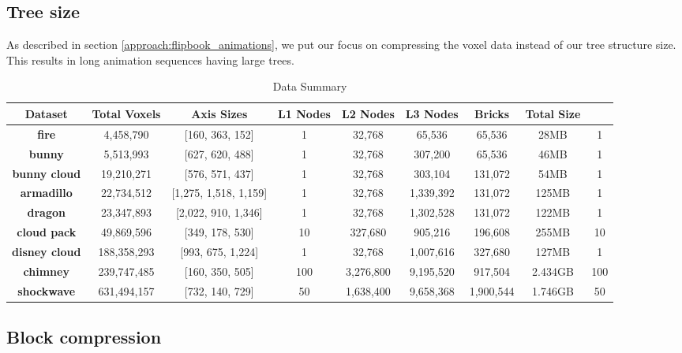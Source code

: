 \subsection{Tree size} \label{results:tree_size}
As described in section \ref{approach:flipbook_animations}, we put our focus on compressing the voxel data instead of our tree structure size. This results in long animation sequences having large trees.  

\begin{table}[htbp]
    \centering
    \caption{Data Summary}
    \label{tab:data-summary}
    \begin{tabularx}{\textwidth}{|c|c|c|c|c|c|c|c|c|}
    \hline
    \textbf{Dataset} & \textbf{Total Voxels} & \textbf{Axis Sizes} & \textbf{L1 Nodes} & \textbf{L2 Nodes} & \textbf{L3 Nodes} & \textbf{Bricks} & \textbf{Total Size} \\
    \hline
    \textbf{fire} & 4,458,790 & [160, 363, 152] & 1 & 32,768 & 65,536 & 65,536 & 28MB & 1 \\
    \hline
    \textbf{bunny} & 5,513,993 & [627, 620, 488] & 1 & 32,768 & 307,200 & 65,536 & 46MB & 1 \\
    \hline
    \textbf{bunny cloud} & 19,210,271 & [576, 571, 437] & 1 & 32,768 & 303,104 & 131,072 & 54MB & 1 \\
    \hline
    \textbf{armadillo} & 22,734,512 & [1,275, 1,518, 1,159] & 1 & 32,768 & 1,339,392 & 131,072 & 125MB & 1 \\
    \hline
    \textbf{dragon} & 23,347,893 & [2,022, 910, 1,346] & 1 & 32,768 & 1,302,528 & 131,072 & 122MB & 1 \\
    \hline
    \textbf{cloud pack} & 49,869,596 & [349, 178, 530] & 10 & 327,680 & 905,216 & 196,608 & 255MB & 10 \\
    \hline
    \textbf{disney cloud} & 188,358,293 & [993, 675, 1,224] & 1 & 32,768 & 1,007,616 & 327,680 & 127MB & 1 \\
    \hline
    \textbf{chimney} & 239,747,485 & [160, 350, 505] & 100 & 3,276,800 & 9,195,520 & 917,504 & 2.434GB & 100 \\
    \hline
    \textbf{shockwave} & 631,494,157 & [732, 140, 729] & 50 & 1,638,400 & 9,658,368 & 1,900,544 & 1.746GB & 50 \\
    \hline
    \end{tabularx}
\end{table}

\subsection{Block compression} \label{results:block_compression}

